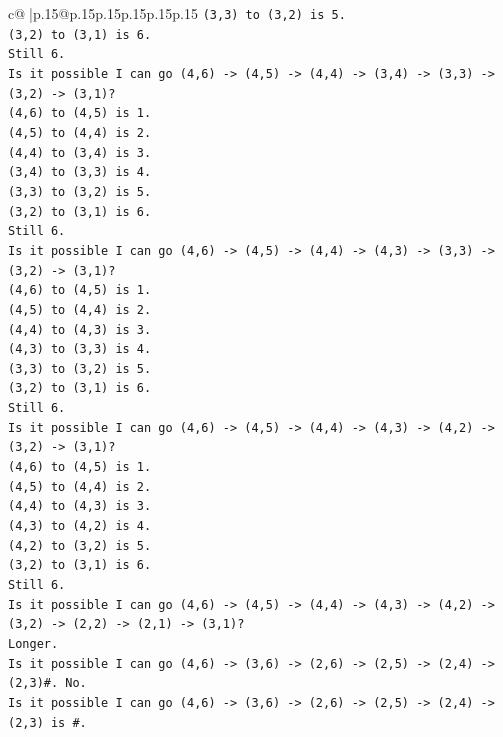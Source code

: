 \documentclass{article}
\begin{document}
{\begin{supertabular}{c@{$\;$}|p{.15\linewidth}@{}p{.15\linewidth}p{.15\linewidth}p{.15\linewidth}p{.15\linewidth}p{.15\linewidth}}
{{{\texttt{(3,3) to (3,2) is 5.} \\
\texttt{(3,2) to (3,1) is 6.} \\
\texttt{Still 6.} \\
\texttt{Is it possible I can go (4,6) {-}> (4,5) {-}> (4,4) {-}> (3,4) {-}> (3,3) {-}> (3,2) {-}> (3,1)?} \\
\texttt{(4,6) to (4,5) is 1.} \\
\texttt{(4,5) to (4,4) is 2.} \\
\texttt{(4,4) to (3,4) is 3.} \\
\texttt{(3,4) to (3,3) is 4.} \\
\texttt{(3,3) to (3,2) is 5.} \\
\texttt{(3,2) to (3,1) is 6.} \\
\texttt{Still 6.} \\
\texttt{Is it possible I can go (4,6) {-}> (4,5) {-}> (4,4) {-}> (4,3) {-}> (3,3) {-}> (3,2) {-}> (3,1)?} \\
\texttt{(4,6) to (4,5) is 1.} \\
\texttt{(4,5) to (4,4) is 2.} \\
\texttt{(4,4) to (4,3) is 3.} \\
\texttt{(4,3) to (3,3) is 4.} \\
\texttt{(3,3) to (3,2) is 5.} \\
\texttt{(3,2) to (3,1) is 6.} \\
\texttt{Still 6.} \\
\texttt{Is it possible I can go (4,6) {-}> (4,5) {-}> (4,4) {-}> (4,3) {-}> (4,2) {-}> (3,2) {-}> (3,1)?} \\
\texttt{(4,6) to (4,5) is 1.} \\
\texttt{(4,5) to (4,4) is 2.} \\
\texttt{(4,4) to (4,3) is 3.} \\
\texttt{(4,3) to (4,2) is 4.} \\
\texttt{(4,2) to (3,2) is 5.} \\
\texttt{(3,2) to (3,1) is 6.} \\
\texttt{Still 6.} \\
\texttt{Is it possible I can go (4,6) {-}> (4,5) {-}> (4,4) {-}> (4,3) {-}> (4,2) {-}> (3,2) {-}> (2,2) {-}> (2,1) {-}> (3,1)?} \\
\texttt{Longer.} \\
\texttt{Is it possible I can go (4,6) {-}> (3,6) {-}> (2,6) {-}> (2,5) {-}> (2,4) {-}> (2,3)\#. No.} \\
\texttt{Is it possible I can go (4,6) {-}> (3,6) {-}> (2,6) {-}> (2,5) {-}> (2,4) {-}> (2,3) is \#.} \\
}}}
\end{supertabular}}
\end{document}
